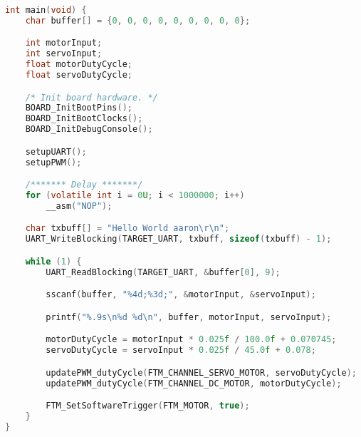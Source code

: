 \begin{lstlisting}[language=c,caption=Problem 2 main, label=list:p2]
int main(void) {
	char buffer[] = {0, 0, 0, 0, 0, 0, 0, 0, 0};

	int motorInput;
	int servoInput;
	float motorDutyCycle;
	float servoDutyCycle;

	/* Init board hardware. */
	BOARD_InitBootPins();
	BOARD_InitBootClocks();
	BOARD_InitDebugConsole();

	setupUART();
	setupPWM();

	/******* Delay *******/
	for (volatile int i = 0U; i < 1000000; i++)
		__asm("NOP");

	char txbuff[] = "Hello World aaron\r\n";
	UART_WriteBlocking(TARGET_UART, txbuff, sizeof(txbuff) - 1);

	while (1) {
		UART_ReadBlocking(TARGET_UART, &buffer[0], 9);

		sscanf(buffer, "%4d;%3d;", &motorInput, &servoInput);

		printf("%.9s\n%d %d\n", buffer, motorInput, servoInput);

		motorDutyCycle = motorInput * 0.025f / 100.0f + 0.070745;
		servoDutyCycle = servoInput * 0.025f / 45.0f + 0.078;

		updatePWM_dutyCycle(FTM_CHANNEL_SERVO_MOTOR, servoDutyCycle);
		updatePWM_dutyCycle(FTM_CHANNEL_DC_MOTOR, motorDutyCycle);

		FTM_SetSoftwareTrigger(FTM_MOTOR, true);
	}
}
\end{lstlisting}
